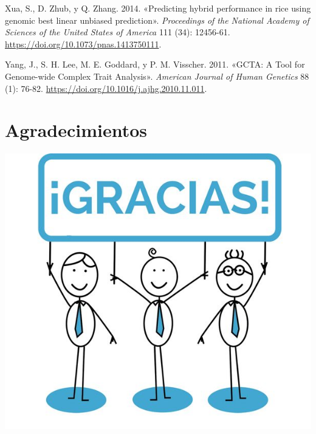\documentclass[11pt,spanish,a4paper,oneside,]{book} %
\begin{document}
\leavevmode\hypertarget{ref-cite:25}{}%
Xua, S., D. Zhub, y Q. Zhang. 2014. «Predicting hybrid performance in rice using genomic best linear unbiased prediction». \emph{Proceedings of the National Academy of Sciences of the United States of America} 111 (34): 12456-61. \url{https://doi.org/10.1073/pnas.1413750111}.

\leavevmode\hypertarget{ref-cite:54}{}%
Yang, J., S. H. Lee, M. E. Goddard, y P. M. Visscher. 2011. «GCTA: A Tool for Genome-wide Complex Trait Analysis». \emph{American Journal of Human Genetics} 88 (1): 76-82. \url{https://doi.org/10.1016/j.ajhg.2010.11.011}.

\endgroup

\hypertarget{agradecimientos}{%
\chapter*{Agradecimientos}\label{agradecimientos}}


\includegraphics{figures/uvalogo_regular_p_en.pdf}

\backmatter
\end{document}
